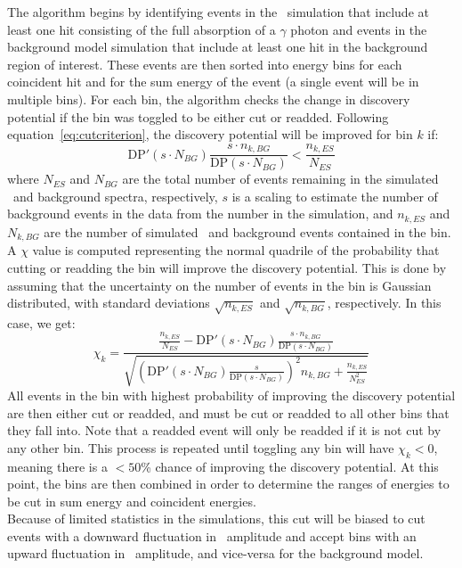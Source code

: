 \documentclass[/main.tex]{subfiles}
\begin{document}
The algorithm begins by identifying events in the \bbes\ simulation that include at least one hit consisting of the full absorption of a $\gamma$ photon and events in the background model simulation that include at least one hit in the background region of interest.
These events are then sorted into energy bins for each coincident hit and for the sum energy of the event (a single event will be in multiple bins).
For each bin, the algorithm checks the change in discovery potential if the bin was toggled to be either cut or readded.
Following equation~\ref{eq:cutcriterion}, the discovery potential will be improved for bin $k$ if:
\begin{equation}
  \mathrm{DP}'(s\cdot N_{BG})\frac{s\cdot n_{k,BG}}{\mathrm{DP}(s\cdot N_{BG})} < \frac{n_{k,ES}}{N_{ES}}
\end{equation}
where $N_{ES}$ and $N_{BG}$ are the total number of events remaining in the simulated \bbes\ and background spectra, respectively, $s$ is a scaling to estimate the number of background events in the data from the number in the simulation, and $n_{k,ES}$ and $N_{k,BG}$ are the number of simulated \bbes\ and background events contained in the bin.
A $\chi$ value is computed representing the normal quadrile of the probability that cutting or readding the bin will improve the discovery potential.
This is done by assuming that the uncertainty on the number of events in the bin is Gaussian distributed, with standard deviations $\sqrt{n_{k,ES}}$ and $\sqrt{n_{k,BG}}$, respectively.
In this case, we get:
\begin{equation}
  \chi_k = \frac{ \frac{n_{k,ES}}{N_{ES}} - \mathrm{DP}'(s\cdot N_{BG})\frac{s\cdot n_{k,BG}}{\mathrm{DP}(s\cdot N_{BG})} }{ \sqrt{ (\mathrm{DP}'(s\cdot N_{BG})\frac{s}{\mathrm{DP}(s\cdot N_{BG})})^2n_{k,BG} + \frac{n_{k,ES}}{N_{ES}^2} } }
\end{equation}
All events in the bin with highest probability of improving the discovery potential are then either cut or readded, and must be cut or readded to all other bins that they fall into.
Note that a readded event will only be readded if it is not cut by any other bin.
This process is repeated until toggling any bin will have $\chi_k<0$, meaning there is a $<50$\% chance of improving the discovery potential.
At this point, the bins are then combined in order to determine the ranges of energies to be cut in sum energy and coincident energies.
\\
Because of limited statistics in the simulations, this cut will be biased to cut events with a downward fluctuation in \bbes\ amplitude and accept bins with an upward fluctuation in \bbes\ amplitude, and vice-versa for the background model.
\end{document}
